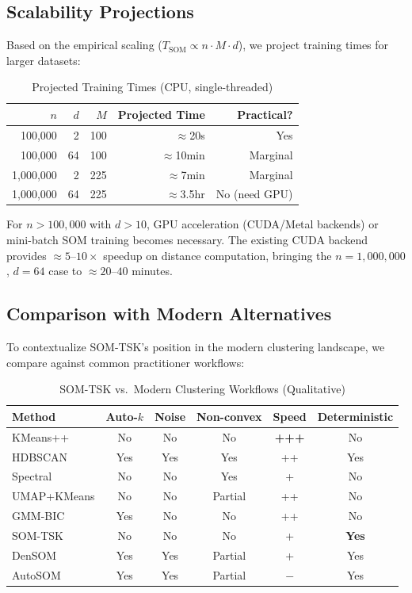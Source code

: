 \documentclass[journal]{IEEEtran}
\begin{document}
\subsection{Scalability Projections}
\label{sec:scalability_proj}

Based on the empirical scaling ($T_{\text{SOM}} \propto n \cdot M \cdot d$), we project training times for larger datasets:

\begin{table}[!t]
\caption{Projected Training Times (CPU, single-threaded)}
\label{tab:projections}
\centering
\renewcommand{\arraystretch}{1.1}
\small
\begin{tabular}{rrrrr}
\toprule
$n$ & $d$ & $M$ & Projected Time & Practical? \\
\midrule
100,000 & 2 & 100 & $\approx$20s & Yes \\
100,000 & 64 & 100 & $\approx$10min & Marginal \\
1,000,000 & 2 & 225 & $\approx$7min & Marginal \\
1,000,000 & 64 & 225 & $\approx$3.5hr & No (need GPU) \\
\bottomrule
\end{tabular}
\end{table}

For $n > 100{,}000$ with $d > 10$, GPU acceleration (CUDA/Metal backends) or mini-batch SOM training becomes necessary. The existing CUDA backend provides $\approx 5$--$10\times$ speedup on distance computation, bringing the $n=1{,}000{,}000$, $d=64$ case to $\approx 20$--$40$ minutes.

\subsection{Comparison with Modern Alternatives}
\label{sec:modern_comparison}

To contextualize SOM-TSK's position in the modern clustering landscape, we compare against common practitioner workflows:

\begin{table}[!t]
\caption{SOM-TSK vs.\ Modern Clustering Workflows (Qualitative)}
\label{tab:modern}
\centering
\renewcommand{\arraystretch}{1.1}
\small
\setlength{\tabcolsep}{2.5pt}
\begin{tabular}{p{2.2cm}ccccc}
\toprule
Method & Auto-$k$ & Noise & Non-convex & Speed & Deterministic \\
\midrule
KMeans++ & No & No & No & \textbf{+++} & No \\
HDBSCAN & Yes & Yes & Yes & ++ & Yes \\
Spectral & No & No & Yes & + & No \\
UMAP+KMeans & No & No & Partial & ++ & No \\
GMM-BIC & Yes & No & No & ++ & No \\
\midrule
SOM-TSK & No & No & No & + & \textbf{Yes} \\
DenSOM & Yes & Yes & Partial & + & Yes \\
AutoSOM & Yes & Yes & Partial & $-$ & Yes \\
\bottomrule
\end{tabular}
\end{table}
\end{document}
